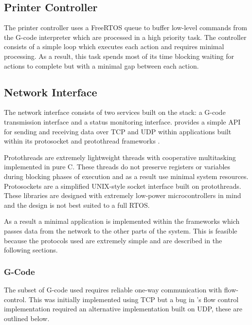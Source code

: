 		\subsection{Printer Controller}
			
			The printer controller uses a FreeRTOS queue to buffer low-level commands
			from the G-code interpreter which are processed in a high priority task.
			The controller consists of a simple loop which executes each action and
			requires minimal processing. As a result, this task spends most of its
			time blocking waiting for actions to complete but with a minimal gap
			between each action.
		
		\subsection{Network Interface}
			
			The network interface consists of two services built on the \uIP{} stack:
			a G-code transmission interface and a status monitoring interface. \uIP{}
			provides a simple API for sending and receiving data over TCP and UDP
			within applications built within its protosocket and protothread
			frameworks \cite{uIP}.
			
			Protothreads are extremely lightweight threads with cooperative
			multitasking implemented in pure C. These threads do not preserve
			registers or variables during blocking phases of execution and as a result
			use minimal system resources. Protosockets are a simplified UNIX-style
			socket interface built on protothreads. These libraries are designed with
			extremely low-power microcontrollers in mind and the design is not best
			suited to a full RTOS.
			
			As a result a minimal application is implemented within the \uIP{}
			frameworks which passes data from the network to the other parts of the
			system. This is feasible because the protocols used are extremely simple
			and are described in the following sections.
			
			\subsubsection{G-Code}
				
				The subset of G-code used requires reliable one-way communication with
				flow-control. This was initially implemented using TCP but a bug in
				\uIP{}'s flow control implementation required an alternative
				implementation built on UDP, these are outlined below.
				
